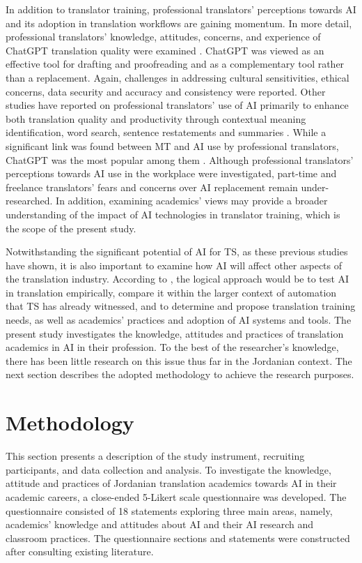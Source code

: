 \documentclass[english]{textolivre}
\begin{document}
In addition to translator training, professional translators’ perceptions towards AI and its adoption in translation workflows are gaining momentum. In more detail, professional translators’ knowledge, attitudes, concerns, and experience of ChatGPT translation quality were examined \cite{shi2025}. ChatGPT was viewed as an effective tool for drafting and proofreading and as a complementary tool rather than a replacement. Again, challenges in addressing cultural sensitivities, ethical concerns, data security and accuracy and consistency were reported. Other studies have reported on professional translators’ use of AI primarily to enhance both translation quality and productivity through contextual meaning identification, word search, sentence restatements and summaries \cite{farrell2024}. While a significant link was found between MT and AI use by professional translators, ChatGPT was the most popular among them \cite{farrell2024}. Although professional translators’ perceptions towards AI use in the workplace were investigated, part-time and freelance translators’ fears and concerns over AI replacement remain under-researched. In addition, examining academics’ views may provide a broader understanding of the impact of AI technologies in translator training, which is the scope of the present study.

Notwithstanding the significant potential of AI for TS, as these previous studies have shown, it is also important to examine how AI will affect other aspects of the translation industry. According to \textcite{pym2023}, the logical approach would be to test AI in translation empirically, compare it within the larger context of automation that TS has already witnessed, and to determine and propose translation training needs, as well as academics’ practices and adoption of AI systems and tools. The present study investigates the knowledge, attitudes and practices of translation academics in AI in their profession. To the best of the researcher’s knowledge, there has been little research on this issue thus far in the Jordanian context. The next section describes the adopted methodology to achieve the research purposes.

\section{Methodology}
This section presents a description of the study instrument, recruiting participants, and data collection and analysis. To investigate the knowledge, attitude and practices of Jordanian translation academics towards AI in their academic careers, a close-ended 5-Likert scale questionnaire was developed. The questionnaire consisted of 18 statements exploring three main areas, namely, academics’ knowledge and attitudes about AI and their AI research and classroom practices. The questionnaire sections and statements were constructed after consulting existing literature.
\end{document}
